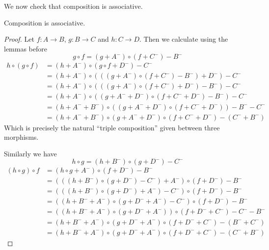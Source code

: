 \documentclass{article}
\begin{document}
We now check that composition is associative.
\begin{proposition}
    Composition is associative.
\end{proposition}
\begin{proof}
    Let $f : A \to B$, $g : B \to C$ and $h : C \to D$.
    Then we calculate using the lemmas before
    \[ g \circ f = (g + A^-) \circ (f + C^-) - B^-\]
    \begin{align*}
        h \circ (g \circ f) 
        &= (h + A^-) \circ (g \circ f + D^-) - C^- 
        \\&= (h + A^-) \circ ( ((g + A^-) \circ (f + C^-) - B^- ) + D^-) - C^-
        \\&= (h + A^-) \circ ( ((g + A^-) \circ (f + C^-) + D^- ) - B^-) - C^-
        \\&= (h + A^-) \circ  ((g + A^- + D^-) \circ (f + C^- + D^-) - B^-) - C^-
        \\&= (h + A^- + B^-) \circ ((g + A^- + D^-) \circ (f + C^- + D^-)) - B^- - C^-
        \\&= (h + A^- + B^-) \circ (g + A^- + D^-) \circ (f + C^- + D^-) - (C^- + B^-)
    \end{align*} 
    Which is precisely the natural ``triple composition'' given between three morphisms.

    Similarly we have 
    \[ h \circ g = (h + B^-) \circ (g + D^-) - C^- \]
    \begin{align*}
        (h \circ g) \circ f 
        &= (h \circ g + A^-) \circ (f + D^-) - B^- 
        \\&= (((h + B^-) \circ (g + D^-) - C^-) + A^-) \circ (f + D^-) - B^-
        \\&=  (((h + B^-) \circ (g + D^-) + A^-) - C^-) \circ (f + D^-) - B^-
        \\&= ((h + B^- + A^-) \circ (g + D^- + A^-) - C^-) \circ (f + D^-) - B^-
        \\&= ((h + B^- + A^-) \circ (g + D^- + A^-)) \circ (f + D^- + C^-) - C^- - B^-
        \\&=  (h + B^- + A^-) \circ (g + D^- + A^-) \circ (f + D^- + C^-) - (B^- + C^-)
        \\&=  (h + B^- + A^-) \circ (g + D^- + A^-) \circ (f + D^- + C^-) - (C^- + B^-)
    \end{align*} 
\end{proof}
\end{document}
